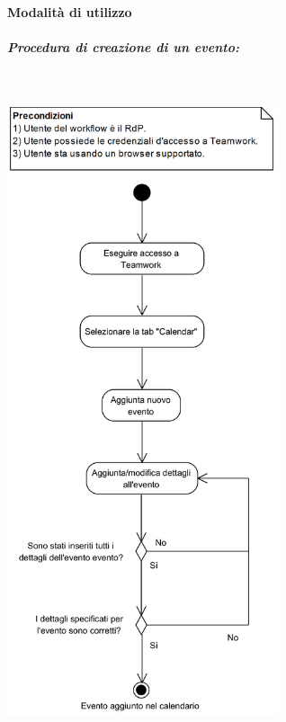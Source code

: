 \paragraph{Modalità di utilizzo} \label{sec:procedure_teamwork}\mbox{}
\begin{samepage}
	\subparagraph{Procedura di creazione di un evento:}\mbox{}\\
	\begin{center}
		\includegraphics[width=8cm]{../../documenti/NormeDiProgetto/DiagrammiProcedure/CreazioneEventoNelCalendario.png}
	\end{center}
\end{samepage}

